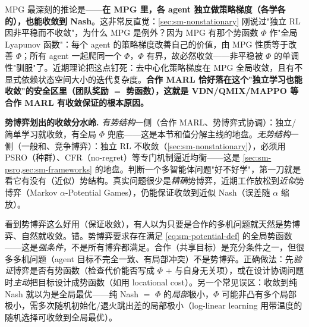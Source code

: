 \begin{insight}
MPG 最深刻的推论是——\textbf{在 MPG 里，各 agent 独立做策略梯度（各学各的），也能收敛到 Nash}。这非常反直觉：\cref{sec:sm-nonstationary} 刚说过"独立 RL 因非平稳而不收敛"，为什么 MPG 是例外？因为 MPG 有那个势函数 $\Phi$ 作"全局 Lyapunov 函数"：每个 agent 的策略梯度改善自己的价值，由 MPG 性质等于改善 $\Phi$；所有 agent 一起爬同一个 $\Phi$，$\Phi$ 有界，故必然收敛——非平稳被 $\Phi$ 的单调性"驯服"了。近期理论把这点钉死：去中心化策略梯度在 MPG 全局收敛\cite{leonardos2022mpg}，且有不显式依赖状态空间大小的迭代复杂度\cite{ding2022mpg}。\textbf{合作 MARL 恰好落在这个"独立学习也能收敛"的安全区里（团队奖励 $=$ 势函数），这就是 VDN/QMIX/MAPPO 等合作 MARL 有收敛保证的根本原因。}
\end{insight}

\begin{note}
\textbf{势博弈划出的收敛分水岭.}\;
\emph{有势结构}一侧（合作 MARL、势博弈式协调）：独立/简单学习就收敛，有全局 $\Phi$ 兜底——这是本节和值分解主线的地盘。\emph{无势结构}一侧（一般和、竞争博弈）：独立 RL 不收敛（\cref{sec:sm-nonstationary}），必须用 PSRO（种群）、CFR（no-regret）等专门机制逼近均衡——这是 \cref{sec:sm-psro,sec:sm-frameworks} 的地盘。判断一个多智能体问题"好不好学"，第一刀就是看它有没有（近似）势结构。真实问题很少是\emph{精确}势博弈，近期工作放松到\emph{近似}势博弈（Markov $\alpha$-Potential Games），仍能保证收敛到近似 Nash（误差随 $\alpha$ 缩放）。
\end{note}

\begin{pitfall}
看到势博弈这么好用（保证收敛），有人以为只要是合作的多机问题就天然是势博弈、自然就收敛。错。势博弈要求存在满足 \cref{eq:sm-potential-def} 的全局势函数——这是\emph{强条件}，不是所有博弈都满足。合作（共享目标）是充分条件之一，但很多多机问题（agent 目标不完全一致、有局部冲突）不是势博弈。正确做法：先\emph{验证}博弈是否有势函数（检查代价能否写成 $\Phi$ $+$ 与自身无关项），或在设计协调问题时\emph{主动}把目标设计成势函数（如用 locational cost）。另一个常见误区：收敛到纯 Nash 就以为是全局最优——纯 Nash $=$ $\Phi$ 的\emph{局部}极小，$\Phi$ 可能非凸有多个局部极小，需多次随机初始化/退火跳出差的局部极小（log-linear learning 用带温度的随机选择可收敛到全局最优）。
\end{pitfall}

